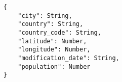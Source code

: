 
\begin{lstlisting}
	{
		"city": String,
		"country": String,
		"country_code": String,
		"latitude": Number,
		"longitude": Number,
		"modification_date": String,
		"population": Number
	}
\end{lstlisting}
